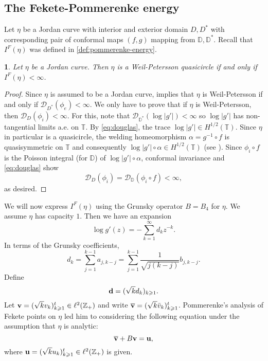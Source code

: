 \documentclass{article}
\numberwithin{equation}{section}
\numberwithin{figure}{section}
\theoremstyle{plain}
\theoremstyle{plain}
\newtheorem{lemma}[thm]{\protect\lemmaname}
\numberwithin{thm}{section}
\theoremstyle{remark}
\providecommand{\lemmaname}{Lemma}
\newcommand{\T}{\mathbb{T}}
\newcommand{\D}{\mathbb{D}}
\newcommand{\Z}{\mathbb{Z}}
\let \ge \geqslant
\begin{document}
\subsection{The Fekete-Pommerenke energy} \label{sect:pommerenke-energy}
Let $\eta$ be a Jordan curve with interior and exterior domain $D, D^*$ with corresponding pair of conformal maps $(f,g)$ mapping from $\D, \D^*$. 
Recall that $I^F(\eta)$ was defined in \eqref{def:pommerenke-energy}.
\begin{lemma}\label{lemma:pommerenkewp2}
    Let $\eta$ be a Jordan curve. Then $\eta$ is a Weil-Petersson quasicircle if and only if $I^F(\eta) < \infty$.
\end{lemma}
\begin{proof} Since $\eta$ is assumed to be a Jordan curve, \cite[Thm 2.1.12]{TT} implies that $\eta$ is Weil-Petersson if and only if $\mathcal{D}_{D^*}(\phi_e) < \infty$. We only have to prove that if $\eta$ is Weil-Petersson, then $\mathcal{D}_{D}(\phi_i) < \infty$. For this, note that $\mathcal{D}_{\D^*}(\log|g'|) < \infty$ so $\log|g'|$ has non-tangential limits a.e. on $\T$. By \eqref{eq:douglas}, the trace $\log |g'| \in H^{1/2}(\T)$. Since $\eta$ in particular is a quasicircle, the welding homeomorphism $\alpha =  g^{-1} \circ f$ is quasisymmetric on $\T$ and consequently $\log|g'| \circ \alpha \in H^{1/2}(\T)$ (see \cite{NS}). Since $\phi_i \circ f$ is the Poisson integral (for $\D$) of $\log|g'| \circ \alpha$, conformal invariance and \eqref{eq:douglas} show
\[
\mathcal{D}_D(\phi_i) = \mathcal{D}_{\D}(\phi_i \circ f) < \infty,
\]
as desired.
\end{proof}
We will now express $I^F(\eta)$ using the Grunsky operator $B=B_4$ for $\eta$. We assume $\eta$ has capacity $1$.
Then we have an expansion
\[
\log g'(z) = -\sum_{k=1}^\infty  d_k z^{-k}.
\]
In terms of the Grunsky coefficients,
\[
d_k = \sum_{j=1}^{k-1}a_{j, k-j} = \sum_{j=1}^{k-1}\frac{1}{\sqrt{j(k-j)}}b_{j, k-j}.
\]
Define
\begin{equation}\label{dvec}
    {\bf d}=(\sqrt{k} d_k)_{k \ge 1}.
\end{equation}
Let ${\bf v} = (\sqrt{k} v_k)_{k \ge 1}^t \in \ell^2(\Z_+)$ and write $\overline {\bf v} = (\sqrt{k} \bar{v}_k)_{k \ge 1}^t$.
Pommerenke's analysis of Fekete points on $\eta$ led him to considering the following equation under the assumption that $\eta$ is analytic:
\begin{equation}\label{Peq}
\overline {\bf v} + B {\bf v}= {\bf u},
\end{equation}
where ${\bf u} = (\sqrt{k} u_k)_{k \ge 1}^t \in \ell^2(\Z_+)$ is given.
\end{document}
